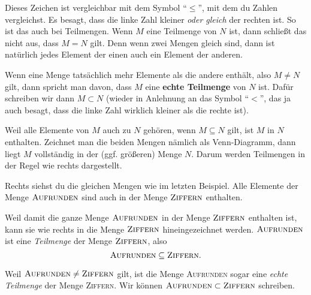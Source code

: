 \documentclass[../../main.tex]{subfiles}
\begin{document}
Dieses Zeichen ist vergleichbar mit dem Symbol \enquote{$\leq$}, mit dem du Zahlen vergleichst. Es besagt, dass die linke Zahl kleiner \emph{oder gleich} der rechten ist. So ist das auch bei Teilmengen. Wenn $M$ eine Teilmenge von $N$ ist, dann schließt das nicht aus, dass $M=N$ gilt. Denn wenn zwei Mengen gleich sind, dann ist natürlich jedes Element der einen auch ein Element der anderen.

Wenn eine Menge tatsächlich mehr Elemente als die andere enthält, also $M\neq N$ gilt, dann spricht man davon, dass $M$ eine \textbf{echte Teilmenge} von $N$ ist. Dafür schreiben wir dann $M\subset N$ (wieder in Anlehnung an das Symbol \enquote{$<$}, das ja auch besagt, dass die linke Zahl wirklich kleiner als die rechte ist).

Weil alle Elemente von $M$ auch zu $N$ gehören, wenn $M\subseteq N$ gilt, ist $M$ in $N$ enthalten. Zeichnet man die beiden Mengen nämlich als Venn-Diagramm, dann liegt $M$ vollständig in der (ggf. größeren) Menge $N$. Darum werden Teilmengen in der Regel wie rechts dargestellt.

\begin{example}{}

    Rechts siehst du die gleichen Mengen wie im letzten Beispiel. Alle Elemente der Menge $\textsc{Aufrunden}$ sind auch in der Menge $\textsc{Ziffern}$ enthalten. 
    
    Weil damit die ganze Menge $\textsc{Aufrunden}$ in der Menge $\textsc{Ziffern}$ enthalten ist, kann sie wie rechts in die Menge $\textsc{Ziffern}$ hineingezeichnet werden. $\textsc{Aufrunden}$ ist eine \emph{Teilmenge} der Menge $\textsc{Ziffern}$, also
    \[\textsc{Aufrunden}\subseteq \textsc{Ziffern}.\]

    Weil $\textsc{Aufrunden}\neq \textsc{Ziffern}$ gilt, ist die Menge \textsc{Aufrunden} sogar eine \emph{echte Teilmenge} der Menge \textsc{Ziffern}. Wir können $\textsc{Aufrunden}\subset \textsc{Ziffern}$ schreiben.
\end{example}
\end{document}
